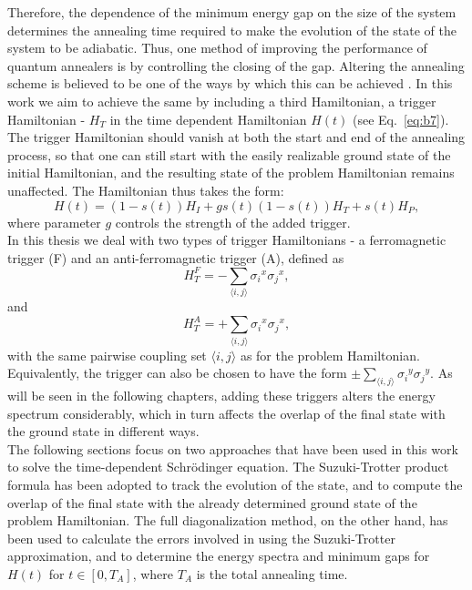 \documentclass[../main.tex]{subfiles}
\begin{document}
Therefore, the dependence of the minimum energy gap on the size of the system determines the annealing time required to make the evolution of the state of the system to be adiabatic. Thus, one method of improving the performance of quantum annealers is by controlling the closing of the gap. Altering the annealing scheme is believed to be one of the ways by which this can be achieved \cite{Albash_2018,hauke2019perspectives,farhi2002quantum,crosson2014different,hormozi2017nonstoquastic}. In this work we aim to achieve the same by including a third Hamiltonian, a trigger Hamiltonian - $H_T$ in the time dependent Hamiltonian $H(t)$ (see Eq.~\ref{eq:b7})\cite{Albash_2018,farhi2002quantum,crosson2014different,hormozi2017nonstoquastic}. The trigger Hamiltonian should vanish at both the start and end of the annealing process, so that one can still start with the easily realizable ground state of the initial Hamiltonian, and the resulting state of the problem Hamiltonian remains unaffected. The Hamiltonian thus takes the form: 
\begin{equation}
H(t)= (1-s(t))H_I + g s(t)(1-s(t))H_T + s(t)H_P ,\label{eq:b12}
\end{equation} 
where parameter $g$ controls the strength of the added trigger.\\

In this thesis we deal with two types of trigger Hamiltonians - a ferromagnetic trigger (F) and an anti-ferromagnetic trigger (A)\cite{hormozi2017nonstoquastic}, defined as
\begin{equation}
H_T^F = - \sum\limits_{\langle i,j\rangle}{\sigma_i}^x{\sigma_j}^x,    \label{eq:b13}
\end{equation}
and
\begin{equation}
H_T^A= +\sum\limits_{\langle i,j \rangle}{\sigma_i}^x{\sigma_j}^x,          \label{eq:b14}
\end{equation}
with the same pairwise coupling set $\langle i,j \rangle$ as for the problem Hamiltonian. Equivalently, the trigger can also be chosen to have the form $\pm {\textstyle\sum}_{\langle i,j\rangle}{\sigma_i}^y{\sigma_j}^y$.
As will be seen in the following chapters, adding these triggers alters the energy spectrum considerably, which in turn affects the overlap of the final state with the ground state in different ways. \\


The following sections focus on two approaches that have been used in this work to solve the time-dependent Schr{\"o}dinger equation. The Suzuki-Trotter product formula has been adopted to track the evolution of the state, and to compute the overlap of the final state with the already determined ground state of the problem Hamiltonian. The full diagonalization method, on the other hand, has been used to calculate the errors involved in using the Suzuki-Trotter approximation, and to determine the energy spectra and minimum gaps for $H(t)$ for $t \in [0,T_A]$, where $T_A$ is the total annealing time.
\end{document}
